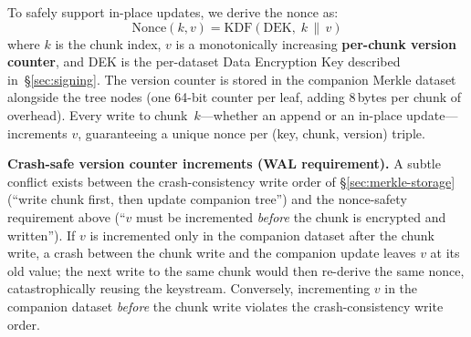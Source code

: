 \documentclass[11pt]{article}
\begin{document}
To safely support in-place updates, we derive the nonce as:
\begin{equation}
  \text{Nonce}(k, v) = \text{KDF}(\text{DEK}, \; k \,\|\, v)
  \label{eq:nonce}
\end{equation}
where $k$ is the chunk index, $v$ is a monotonically increasing
\textbf{per-chunk version counter}, and DEK is the per-dataset Data Encryption
Key described in~\S\ref{sec:signing}. The version counter is stored in the
companion Merkle dataset alongside the tree nodes (one 64-bit counter per
leaf, adding 8\,bytes per chunk of overhead). Every write to chunk~$k$---whether
an append or an in-place update---increments $v$, guaranteeing a unique nonce
per (key, chunk, version) triple.

\noindent\textbf{Crash-safe version counter increments (WAL requirement).}
A subtle conflict exists between the crash-consistency write order of
\S\ref{sec:merkle-storage} (``write chunk first, then update companion
tree'') and the nonce-safety requirement above (``$v$ must be incremented
\emph{before} the chunk is encrypted and written''). If $v$ is incremented
only in the companion dataset after the chunk write, a crash between the
chunk write and the companion update leaves $v$ at its old value; the next
write to the same chunk would then re-derive the same nonce, catastrophically
reusing the keystream. Conversely, incrementing $v$ in the companion dataset
\emph{before} the chunk write violates the crash-consistency write order.
\end{document}
